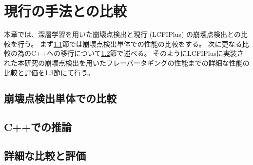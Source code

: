 
\chapter{現行の手法との比較} \label{chap:Comparison}

本章では、深層学習を用いた崩壊点検出と現行 (LCFIPlus) の崩壊点検出との比較を行う。
まず\ref{Com:ComparisonwithVF}節では崩壊点検出単体での性能の比較をする。
次に更なる比較の為のC++への移行について\ref{Com:InferencewithCplusplus}節で述べる。
そのようにLCFIPlusに実装された本研究の崩壊点検出を用いたフレーバータギングの性能までの詳細な性能の比較と評価を\ref{Com:DetailedComparisonandEvaluation}節にて行う。

\section{崩壊点検出単体での比較} \label{Com:ComparisonwithVF}


\section{C++での推論} \label{Com:InferencewithCplusplus}


\section{詳細な比較と評価} \label{Com:DetailedComparisonandEvaluation}

